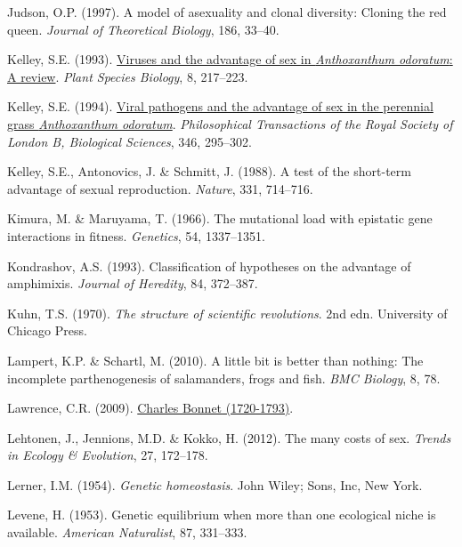 \documentclass[
  american,
  letterpaper,
]{book}
\newlength{\cslhangindent}
\newenvironment{CSLReferences}[2] %
 {\begin{list}{}{%
  \setlength{\itemindent}{0pt}
  \setlength{\leftmargin}{0pt}
  \setlength{\parsep}{0pt}
  \ifodd #1
   \setlength{\leftmargin}{\cslhangindent}
   \setlength{\itemindent}{-1\cslhangindent}
  \fi
  \setlength{\itemsep}{#2\baselineskip}}}
 {\end{list}}
\begin{document}
\begin{CSLReferences}{1}{0}
Judson, O.P. (1997). A model of asexuality and clonal diversity: Cloning
the red queen. \emph{Journal of Theoretical Biology}, 186, 33--40.

Kelley, S.E. (1993).
\href{https://doi.org/10.1111/j.1442-1984.1993.tb00072.x}{Viruses and
the advantage of sex in \emph{{A}nthoxanthum odoratum}: A review}.
\emph{Plant Species Biology}, 8, 217--223.

Kelley, S.E. (1994). \href{https://doi.org/10.1098/rstb.1994.0146}{Viral
pathogens and the advantage of sex in the perennial grass
\emph{{A}nthoxanthum odoratum}}. \emph{Philosophical Transactions of the
Royal Society of London B, Biological Sciences}, 346, 295--302.

Kelley, S.E., Antonovics, J. \& Schmitt, J. (1988). A test of the
short-term advantage of sexual reproduction. \emph{Nature}, 331,
714--716.

Kimura, M. \& Maruyama, T. (1966). The mutational load with epistatic
gene interactions in fitness. \emph{Genetics}, 54, 1337--1351.

Kondrashov, A.S. (1993). Classification of hypotheses on the advantage
of amphimixis. \emph{Journal of Heredity}, 84, 372--387.

Kuhn, T.S. (1970). \emph{The structure of scientific revolutions}. 2nd
edn. University of Chicago Press.

Lampert, K.P. \& Schartl, M. (2010). A little bit is better than
nothing: The incomplete parthenogenesis of salamanders, frogs and fish.
\emph{BMC Biology}, 8, 78.

Lawrence, C.R. (2009). \href{https://hdl.handle.net/10776/1745}{{Charles
Bonnet} (1720-1793)}.

Lehtonen, J., Jennions, M.D. \& Kokko, H. (2012). The many costs of sex.
\emph{Trends in Ecology \& Evolution}, 27, 172--178.

Lerner, I.M. (1954). \emph{Genetic homeostasis}. John Wiley; Sons, Inc,
New York.

Levene, H. (1953). Genetic equilibrium when more than one ecological
niche is available. \emph{American Naturalist}, 87, 331--333.


\end{CSLReferences}
\end{document}
